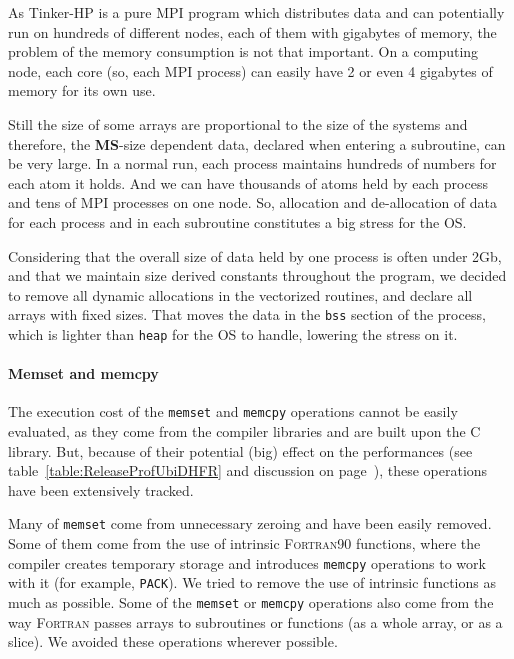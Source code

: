\documentclass[9pt,comparison]{livecoms}
\newcommand{\lv}{\Large\verb}
\begin{document}
As Tinker-HP is a pure MPI program which distributes data and can potentially run on hundreds of different nodes, each of them with gigabytes of memory, the problem of the memory consumption is not that important. On a computing node, each core (so, each MPI process) can easily have 2 or even 4 gigabytes of memory for its own use. 

Still the size of some arrays are proportional to the size of the systems and therefore, the \textbf{MS}-size dependent data, declared when entering a subroutine, can be very large. In a normal run, each process maintains hundreds of numbers for each atom it holds. And we can have thousands of atoms held by each process and tens of MPI processes on one node. So, allocation and de-allocation of data for each process and in each subroutine constitutes a big stress for the OS. 

Considering that the overall size of data held by one process is often under 2Gb, and that we maintain size derived constants throughout the program, we decided to remove all dynamic allocations in the vectorized routines, and declare all arrays with fixed sizes. That moves the data in the {\color{codepurple}\lv|bss|} section of the process, which is lighter than  {\color{codepurple}\lv|heap|} for the OS to handle, lowering the stress on it. 

\paragraph{\normalsize Memset and memcpy}
\hspace{\parindent}The execution cost of the {\color{codegreen}\lv|memset|} and {\color{codegreen}\lv|memcpy|} operations cannot be easily evaluated, as they come from the compiler libraries and are built upon the C library. But, because of their potential (big) effect on the performances (see table~\ref{table:ReleaseProfUbiDHFR} and discussion on page~\pageref{Hotspots}), these operations have been extensively tracked. 

Many of {\color{codegreen}\lv|memset|} come from unnecessary zeroing and have been easily removed. Some of them come from the use of intrinsic \textsc{Fortran90} functions, where the compiler creates temporary storage and introduces {\color{codegreen}\lv|memcpy|} operations to work with it (for example, {\color{blue}\lv|PACK|}). We tried to remove the use of intrinsic functions as much as possible. Some of the {\color{codegreen}\lv|memset|} or {\color{codegreen}\lv|memcpy|} operations also come from the way \textsc{Fortran} passes arrays to subroutines or functions (as a whole array, or as a slice). We avoided these operations wherever possible.
\end{document}
